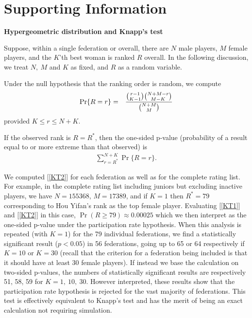 \documentclass[9pt,twocolumn,twoside,lineno]{pnas-new}
\begin{document}

\showacknow{} %


\section*{Supporting Information}



\textbf{Hypergeometric distribution and Knapp's test}
\medskip

Suppose, within a single federation or overall, there are $N$ male players, $M$ female players, and the $K$'th best woman is ranked $R$ overall. In the following discussion, we treat $N,\ M$ and $K$ as fixed, and $R$ as a random variable.

Under the null hypothesis that the ranking order is random, we compute 
\begin{eqnarray}
\Pr\{R=r\} & = & {{r-1 \choose K-1}{N+M-r\choose M-K}\over {N+M \choose M}}
\label{KT1}
\end{eqnarray}
provided $K\le r\le N+K$.

If the observed rank is $R=R^*$, then the one-sided p-value (probability of a result equal to or more extreme than that observed) is 
\begin{eqnarray}
\sum_{r=R^*}^{N+K}\Pr\{R=r\}.
\label{KT2}
\end{eqnarray}

We computed [\ref{KT2}] for each federation as well as for the complete rating list. For example, in the complete rating list including juniors but excluding inactive players, we have $N=155368$, $M=17389$, and if $K=1$ then $R^*=79$ corresponding to Hou Yifan's rank as the top female player. Evaluating [\ref{KT1}] and [\ref{KT2}] in this case, $\Pr(R\ge 79)\approx 0.00025$ which we then interpret as the one-sided p-value under the participation rate hypothesis. When this analysis is repeated (with $K=1$) for the 79 individual federations, we find a statistically significant result ($p<0.05$) in 56 federations, going up to 65 or 64 respectively if $K=10$ or $K=30$ (recall that the criterion for a federation being included is that it should have at least 30 female players). If instead we base the calculation on two-sided p-values, the numbers of statistically significant results are respectively 51, 58, 59 for $K=1,\ 10,\ 30$. However interpreted, these results show that the participation rate hypothesis is rejected for the vast majority of federations. This test is effectively equivalent to Knapp's test \cite{knapp2010prsb} and has the merit of being an exact calculation not requiring simulation.
\end{document}
